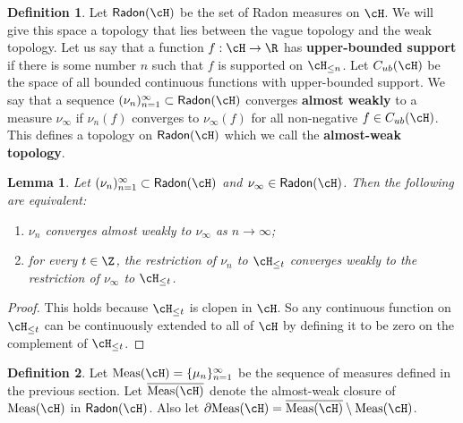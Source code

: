 \documentclass[12pt]{article}
\theoremstyle{plain}
\newtheorem{lem}[thm]{Lemma}
\theoremstyle{definition}
\newtheorem{defn}{Definition}
\theoremstyle{remark}
\newcommand\Meas{{\operatorname{Meas}}}
\newcommand\Radon{\mathsf{Radon}}
\begin{document}
\begin{defn}
  Let $\Radon(\cH)$ be the set of Radon measures on $\cH$. We will give this space a topology that lies between the vague topology and the weak topology. Let us say that a function $f:\cH \to \R$ has {\bf upper-bounded support} if there is some number $n$ such that $f$ is supported on $\cH_{\le n}$. Let $C_{ub}(\cH)$ be the space of all bounded continuous functions with upper-bounded support. We say that a sequence $(\nu_n)_{n=1}^\infty \subset \Radon(\cH)$ converges {\bf almost weakly} to a measure $\nu_\infty$ if $\nu_n(f)$ converges to $\nu_\infty(f)$ for all non-negative $f \in C_{ub}(\cH)$.  This defines a topology on $\Radon(\cH)$ which we call the {\bf almost-weak topology}.
\end{defn}

\begin{lem}\label{L:almost-weak}
    Let $(\nu_n)_{n=1}^\infty \subset \Radon(\cH)$ and $\nu_\infty \in \Radon(\cH)$. Then the following are equivalent:
    \begin{enumerate}
        \item $\nu_n$ converges almost weakly to $\nu_\infty$ as $n\to\infty$;
        \item for every $t\in \Z$, the restriction of $\nu_n$ to $\cH_{\le t}$ converges weakly to the restriction of $\nu_\infty$ to $\cH_{\le t}$.
    \end{enumerate}
\end{lem}

\begin{proof}
    This holds because $\cH_{\le t}$ is clopen in $\cH$. So any continuous function on $\cH_{\le t}$ can be continuously extended to all of $\cH$ by defining it to be zero on the complement of $\cH_{\le t}$.
\end{proof}


\begin{defn}\label{D:limit-measures}
Let $\Meas(\cH)=\{\mu_n\}_{n=1}^\infty$ be the sequence of measures defined in the previous section. Let $\overline{\Meas(\cH)}$ denote the almost-weak closure of $\Meas(\cH)$ in $\Radon(\cH)$. Also let $\partial \Meas(\cH) = \overline{\Meas(\cH)} \setminus \Meas(\cH)$.
\end{defn}
\end{document}
